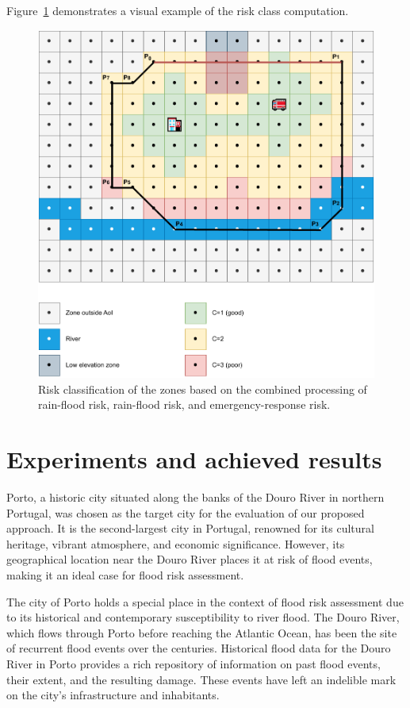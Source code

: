 \begin{refsection}
Figure~\ref{fig:zones_and_pois_classified} demonstrates a visual example of the risk class computation.

\begin{figure}[ht]
  \centering
  \includegraphics[width=0.9\linewidth]{Chapters/6-Flood/figs/zones_and_pois_classified.pdf}
  \caption{Risk classification of the zones based on the combined processing of rain-flood risk, rain-flood risk, and emergency-response risk.}\label{fig:zones_and_pois_classified}
\end{figure}

\section{Experiments and achieved results}\label{sec:simulation}

Porto, a historic city situated along the banks of the Douro River in northern Portugal, was chosen as the target city for the evaluation of our proposed approach. It is the second-largest city in Portugal, renowned for its cultural heritage, vibrant atmosphere, and economic significance. However, its geographical location near the Douro River places it at risk of flood events, making it an ideal case for flood risk assessment.

The city of Porto holds a special place in the context of flood risk assessment due to its historical and contemporary susceptibility to river flood. The Douro River, which flows through Porto before reaching the Atlantic Ocean, has been the site of recurrent flood events over the centuries. Historical flood data for the Douro River in Porto provides a rich repository of information on past flood events, their extent, and the resulting damage. These events have left an indelible mark on the city's infrastructure and inhabitants.


\end{refsection}
